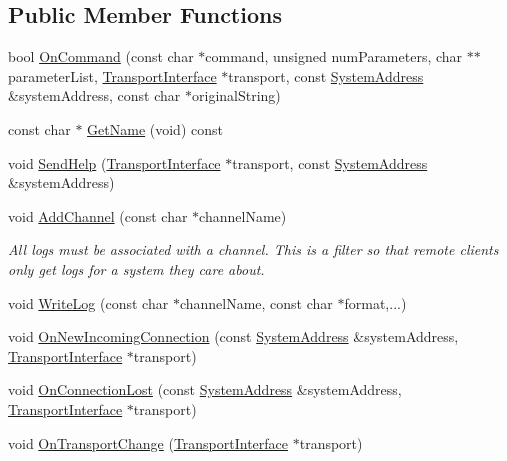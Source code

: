 \subsection*{Public Member Functions}
\begin{DoxyCompactItemize}
\item 
bool \hyperlink{class_rak_net_1_1_log_command_parser_aceb0d8004cef19e78cd630b68c680c63}{On\-Command} (const char $\ast$command, unsigned num\-Parameters, char $\ast$$\ast$parameter\-List, \hyperlink{class_rak_net_1_1_transport_interface}{Transport\-Interface} $\ast$transport, const \hyperlink{struct_rak_net_1_1_system_address}{System\-Address} \&system\-Address, const char $\ast$original\-String)
\item 
const char $\ast$ \hyperlink{class_rak_net_1_1_log_command_parser_a037b5b2323e7135c85bbcb3a271e4890}{Get\-Name} (void) const 
\item 
void \hyperlink{class_rak_net_1_1_log_command_parser_a6e7b04559fd0ba7e65d52f85a47b3819}{Send\-Help} (\hyperlink{class_rak_net_1_1_transport_interface}{Transport\-Interface} $\ast$transport, const \hyperlink{struct_rak_net_1_1_system_address}{System\-Address} \&system\-Address)
\item 
void \hyperlink{class_rak_net_1_1_log_command_parser_a921eaa0b9ce3d59f265b19b015a65370}{Add\-Channel} (const char $\ast$channel\-Name)
\begin{DoxyCompactList}\small\item\em All logs must be associated with a channel. This is a filter so that remote clients only get logs for a system they care about. \end{DoxyCompactList}\item 
void \hyperlink{class_rak_net_1_1_log_command_parser_a2811b62171be28fed86ce6e2477c8cf9}{Write\-Log} (const char $\ast$channel\-Name, const char $\ast$format,...)
\item 
void \hyperlink{class_rak_net_1_1_log_command_parser_a399c67161aa82888fe2facf7bfda3c53}{On\-New\-Incoming\-Connection} (const \hyperlink{struct_rak_net_1_1_system_address}{System\-Address} \&system\-Address, \hyperlink{class_rak_net_1_1_transport_interface}{Transport\-Interface} $\ast$transport)
\item 
void \hyperlink{class_rak_net_1_1_log_command_parser_a8d46296b09f54817d0200e8a557bc802}{On\-Connection\-Lost} (const \hyperlink{struct_rak_net_1_1_system_address}{System\-Address} \&system\-Address, \hyperlink{class_rak_net_1_1_transport_interface}{Transport\-Interface} $\ast$transport)
\item 
void \hyperlink{class_rak_net_1_1_log_command_parser_a87fb1e549a73610575f8ec89077d9fdc}{On\-Transport\-Change} (\hyperlink{class_rak_net_1_1_transport_interface}{Transport\-Interface} $\ast$transport)
\end{DoxyCompactItemize}
